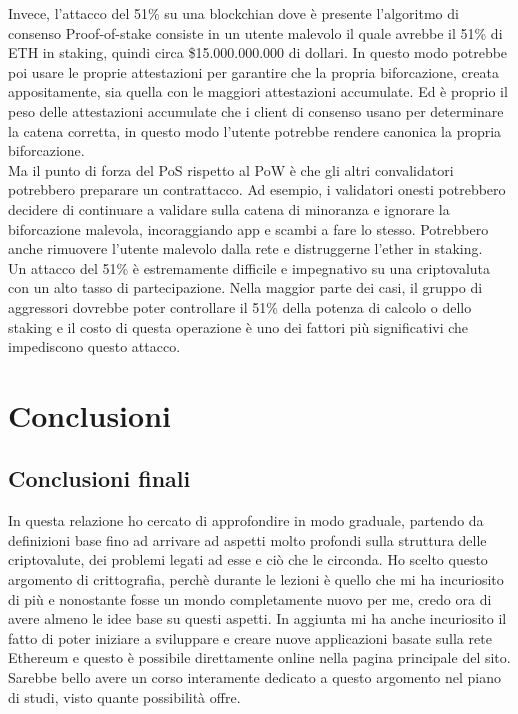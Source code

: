 \documentclass[a4paper,11pt]{report}
\begin{document}
Invece, l'attacco del 51\% su una blockchian dove è presente l'algoritmo di consenso Proof-of-stake consiste in un utente malevolo il quale avrebbe il 51\% di ETH in staking, quindi circa \$15.000.000.000 di dollari. In questo modo potrebbe poi usare le proprie attestazioni per garantire che la propria biforcazione, creata appositamente, sia quella con le maggiori attestazioni accumulate. Ed è proprio il peso delle attestazioni accumulate che i client di consenso usano per determinare la catena corretta, in questo modo l'utente potrebbe rendere canonica la propria biforcazione.\\ 
Ma il punto di forza del PoS rispetto al PoW è che gli altri convalidatori potrebbero preparare un contrattacco. Ad esempio, i validatori onesti potrebbero decidere di continuare a validare sulla catena di minoranza e ignorare la biforcazione malevola, incoraggiando app e scambi a fare lo stesso. Potrebbero anche rimuovere l'utente malevolo dalla rete e distruggerne l'ether in staking. \\

Un attacco del 51\% è estremamente difficile e impegnativo su una criptovaluta con un alto tasso di partecipazione. Nella maggior parte dei casi, il gruppo di aggressori dovrebbe poter controllare il 51\% della potenza di calcolo o dello staking e il costo di questa operazione è uno dei fattori più significativi che impediscono questo attacco.

\chapter{Conclusioni}
\section{Conclusioni finali}
In questa relazione ho cercato di approfondire in modo graduale, partendo da definizioni base fino ad arrivare ad aspetti molto profondi sulla struttura delle criptovalute, dei problemi legati ad esse e ciò che le circonda. Ho scelto questo argomento di crittografia, perchè durante le lezioni è quello che mi ha incuriosito di più e nonostante fosse un mondo completamente nuovo per me, credo ora di avere almeno le idee base su questi aspetti. In aggiunta mi ha anche incuriosito il fatto di poter iniziare a sviluppare e creare nuove applicazioni basate sulla rete Ethereum e questo è possibile direttamente online nella pagina principale del sito. Sarebbe bello avere un corso interamente dedicato a questo argomento nel piano di studi, visto quante possibilità offre.   
\end{document}

